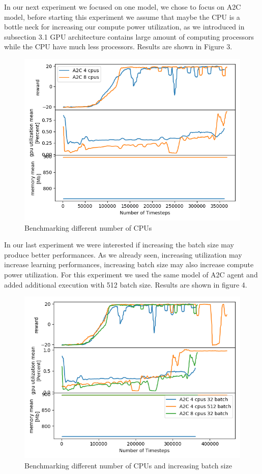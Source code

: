 \documentclass[11 pt, twocolumn]{article}
\begin{document}
In our next experiment we focused on one model, we chose to focus on A2C model, before starting this experiment we assume that maybe the CPU is a bottle neck for increasing our compute power utilization, as we introduced in subsection 3.1 GPU architecture contains large amount of computing processors while the CPU have much less processors. Results are shown in Figure 3.
\begin{figure}
\centering
\includegraphics[width=0.93\columnwidth]{a2c_ncpus.png}
\caption{Benchmarking different number of CPUs}
\vspace*{2pt}
\end{figure}



In our last experiment we were interested if increasing the batch size may produce better performances. As we already seen, increasing utilization may increase learning performances, increasing batch size may also increase compute power utilization. For this experiment we used the same model of A2C agent and added additional execution with 512 batch size. Results are shown in figure 4.
\begin{figure}
\centering
\includegraphics[width=0.93\columnwidth]{a2c_ncpus_nbatch.png}
\caption{Benchmarking different number of CPUs and increasing batch size}
\vspace*{2pt}
\end{figure}
\end{document}
